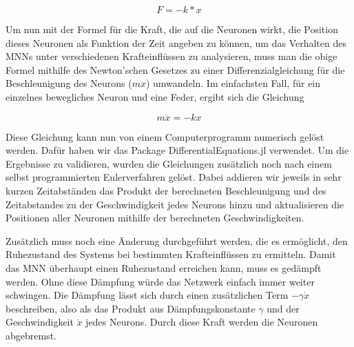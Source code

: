 {\[
    F = -k *  x
\]}

Um nun mit der Formel für die Kraft, die auf die Neuronen wirkt, die Position dieses Neuronen als Funktion der Zeit angeben zu können, um das Verhalten des MNNs unter verschiedenen Krafteinflüssen zu analysieren, muss man die obige Formel 
mithilfe des Newton'schen Gesetzes
zu einer Differenzialgleichung für die Beschleunigung des Neurons ($m \ddot x $) umwandeln.
Im einfachsten Fall, für ein einzelnes bewegliches Neuron und eine Feder, ergibt sich die Gleichung 

{\[
m \ddot{x} = -k x
\]}


Diese Gleichung kann nun von einem Computerprogramm numerisch gelöst werden. Dafür haben wir das Package DifferentialEquations.jl verwendet.
Um die Ergebnisse zu validieren, wurden die Gleichungen zusätzlich noch nach einem selbst programmierten Eulerverfahren gelöst.
Dabei addieren wir jeweils in sehr kurzen Zeitabständen das Produkt der berechneten Beschleunigung und des Zeitabstandes zu der Geschwindigkeit jedes Neurons hinzu und aktualisieren die Positionen aller Neuronen mithilfe der berechneten Geschwindigkeiten.

Zusätzlich muss noch eine Änderung durchgeführt werden, die es ermöglicht, den Ruhezustand des Systems bei bestimmten Krafteinflüssen zu ermitteln.
Damit das MNN überhaupt einen Ruhezustand erreichen kann, muss es gedämpft werden.
Ohne diese Dämpfung würde das Netzwerk einfach immer weiter schwingen. 
Die Dämpfung lässt sich durch einen zusätzlichen Term $-\gamma \dot{x}$ beschreiben, also als das Produkt aus 
Dämpfungskonstante $\gamma$ und der
Geschwindigkeit $\dot{x}$ jedes Neurons.
Durch diese Kraft werden die Neuronen abgebremst.

